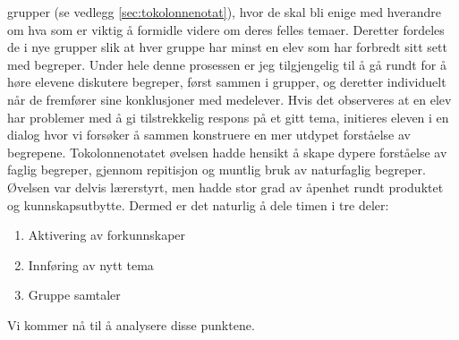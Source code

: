 \documentclass[main.tex]{subfiles}
\begin{document}
grupper (se vedlegg \ref{sec:tokolonnenotat}), hvor de skal bli enige med hverandre om hva som er 
viktig å formidle videre om deres felles temaer. Deretter fordeles de i nye grupper slik at hver 
gruppe har minst en elev som har forbredt sitt sett med begreper. Under hele denne prosessen er jeg 
tilgjengelig til å gå rundt for å høre elevene diskutere begreper, først sammen i grupper, og 
deretter individuelt når de fremfører sine konklusjoner med medelever. Hvis det observeres at en 
elev har problemer med å gi tilstrekkelig respons på et gitt tema, initieres eleven i en dialog 
hvor vi forsøker å sammen konstruere en mer utdypet forståelse av begrepene.
Tokolonnenotatet øvelsen hadde hensikt å skape dypere forståelse av faglig begreper, 
gjennom repitisjon og muntlig bruk av naturfaglig begreper. Øvelsen var delvis lærerstyrt, 
men hadde stor grad av åpenhet rundt produktet og kunnskapsutbytte.
\newline
\newline
Dermed er det naturlig å dele timen i tre deler:
\begin{enumerate}
\item Aktivering av forkunnskaper  
\item Innføring av nytt tema
\item Gruppe samtaler
\end{enumerate}
Vi kommer nå til å analysere disse punktene.
\end{document}
